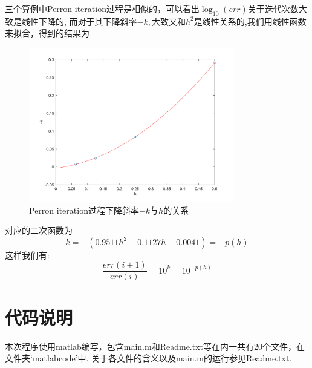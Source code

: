 \documentclass[11pt]{article}
\begin{document}
三个算例中Perron iteration过程是相似的，可以看出$\log_{10}(err)$关于迭代次数大致是线性下降的, 而对于其下降斜率$-k,$大致又和$h^2$是线性关系的,我们用线性函数来拟合，得到的结果为
\begin{figure}[htp!]
\centering
\caption{Perron iteration过程下降斜率$-k$与$h$的关系}
\includegraphics[width=0.8\textwidth]{4.png}
\end{figure}
对应的二次函数为
$$k=-(0.9511h^2+0.1127h-0.0041)=-p(h)$$
这样我们有:
$$\frac{err(i+1)}{err(i)}=10^{k}=10^{-p(h)}$$

\section{代码说明}
本次程序使用matlab编写，包含main.m和Readme.txt等在内一共有20个文件，在文件夹‘matlabcode’中. 关于各文件的含义以及main.m的运行参见Readme.txt.
\end{document}
